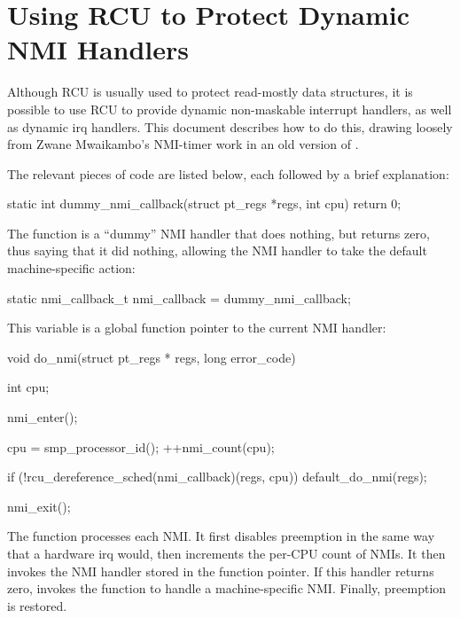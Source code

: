 
\section{Using RCU to Protect Dynamic NMI Handlers}


Although RCU is usually used to protect read-mostly data structures,
it is possible to use RCU to provide dynamic non-maskable interrupt
handlers, as well as dynamic irq handlers.
This document describes
how to do this, drawing loosely from Zwane Mwaikambo's NMI-timer
work in an old version of .

The relevant pieces of code are listed below, each followed by a
brief explanation:

\begin{VerbatimU}
	static int dummy_nmi_callback(struct pt_regs *regs, int cpu)
	{
		return 0;
	}
\end{VerbatimU}

The  function is a ``dummy'' NMI handler that does
nothing, but returns zero, thus saying that it did nothing, allowing
the NMI handler to take the default machine-specific action:

\begin{VerbatimU}
	static nmi_callback_t nmi_callback = dummy_nmi_callback;
\end{VerbatimU}

This  variable is a global function pointer to the current
NMI handler:

\begin{VerbatimU}
	void do_nmi(struct pt_regs * regs, long error_code)
	{
		int cpu;

		nmi_enter();

		cpu = smp_processor_id();
		++nmi_count(cpu);

		if (!rcu_dereference_sched(nmi_callback)(regs, cpu))
			default_do_nmi(regs);

		nmi_exit();
	}
\end{VerbatimU}

The  function processes each NMI\@.
It first disables preemption
in the same way that a hardware irq would, then increments the per-CPU
count of NMIs.
It then invokes the NMI handler stored in the 
function pointer.
If this handler returns zero,  invokes the
 function to handle a machine-specific NMI\@.
Finally,
preemption is restored.


